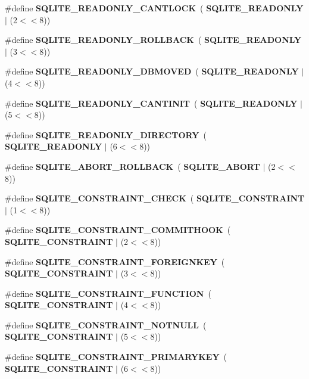 \begin{DoxyCompactItemize}
\item 
\#define \textbf{ S\+Q\+L\+I\+T\+E\+\_\+\+R\+E\+A\+D\+O\+N\+L\+Y\+\_\+\+C\+A\+N\+T\+L\+O\+CK}~(\textbf{ S\+Q\+L\+I\+T\+E\+\_\+\+R\+E\+A\+D\+O\+N\+LY} $\vert$ (2$<$$<$8))
\item 
\#define \textbf{ S\+Q\+L\+I\+T\+E\+\_\+\+R\+E\+A\+D\+O\+N\+L\+Y\+\_\+\+R\+O\+L\+L\+B\+A\+CK}~(\textbf{ S\+Q\+L\+I\+T\+E\+\_\+\+R\+E\+A\+D\+O\+N\+LY} $\vert$ (3$<$$<$8))
\item 
\#define \textbf{ S\+Q\+L\+I\+T\+E\+\_\+\+R\+E\+A\+D\+O\+N\+L\+Y\+\_\+\+D\+B\+M\+O\+V\+ED}~(\textbf{ S\+Q\+L\+I\+T\+E\+\_\+\+R\+E\+A\+D\+O\+N\+LY} $\vert$ (4$<$$<$8))
\item 
\#define \textbf{ S\+Q\+L\+I\+T\+E\+\_\+\+R\+E\+A\+D\+O\+N\+L\+Y\+\_\+\+C\+A\+N\+T\+I\+N\+IT}~(\textbf{ S\+Q\+L\+I\+T\+E\+\_\+\+R\+E\+A\+D\+O\+N\+LY} $\vert$ (5$<$$<$8))
\item 
\#define \textbf{ S\+Q\+L\+I\+T\+E\+\_\+\+R\+E\+A\+D\+O\+N\+L\+Y\+\_\+\+D\+I\+R\+E\+C\+T\+O\+RY}~(\textbf{ S\+Q\+L\+I\+T\+E\+\_\+\+R\+E\+A\+D\+O\+N\+LY} $\vert$ (6$<$$<$8))
\item 
\#define \textbf{ S\+Q\+L\+I\+T\+E\+\_\+\+A\+B\+O\+R\+T\+\_\+\+R\+O\+L\+L\+B\+A\+CK}~(\textbf{ S\+Q\+L\+I\+T\+E\+\_\+\+A\+B\+O\+RT} $\vert$ (2$<$$<$8))
\item 
\#define \textbf{ S\+Q\+L\+I\+T\+E\+\_\+\+C\+O\+N\+S\+T\+R\+A\+I\+N\+T\+\_\+\+C\+H\+E\+CK}~(\textbf{ S\+Q\+L\+I\+T\+E\+\_\+\+C\+O\+N\+S\+T\+R\+A\+I\+NT} $\vert$ (1$<$$<$8))
\item 
\#define \textbf{ S\+Q\+L\+I\+T\+E\+\_\+\+C\+O\+N\+S\+T\+R\+A\+I\+N\+T\+\_\+\+C\+O\+M\+M\+I\+T\+H\+O\+OK}~(\textbf{ S\+Q\+L\+I\+T\+E\+\_\+\+C\+O\+N\+S\+T\+R\+A\+I\+NT} $\vert$ (2$<$$<$8))
\item 
\#define \textbf{ S\+Q\+L\+I\+T\+E\+\_\+\+C\+O\+N\+S\+T\+R\+A\+I\+N\+T\+\_\+\+F\+O\+R\+E\+I\+G\+N\+K\+EY}~(\textbf{ S\+Q\+L\+I\+T\+E\+\_\+\+C\+O\+N\+S\+T\+R\+A\+I\+NT} $\vert$ (3$<$$<$8))
\item 
\#define \textbf{ S\+Q\+L\+I\+T\+E\+\_\+\+C\+O\+N\+S\+T\+R\+A\+I\+N\+T\+\_\+\+F\+U\+N\+C\+T\+I\+ON}~(\textbf{ S\+Q\+L\+I\+T\+E\+\_\+\+C\+O\+N\+S\+T\+R\+A\+I\+NT} $\vert$ (4$<$$<$8))
\item 
\#define \textbf{ S\+Q\+L\+I\+T\+E\+\_\+\+C\+O\+N\+S\+T\+R\+A\+I\+N\+T\+\_\+\+N\+O\+T\+N\+U\+LL}~(\textbf{ S\+Q\+L\+I\+T\+E\+\_\+\+C\+O\+N\+S\+T\+R\+A\+I\+NT} $\vert$ (5$<$$<$8))
\item 
\#define \textbf{ S\+Q\+L\+I\+T\+E\+\_\+\+C\+O\+N\+S\+T\+R\+A\+I\+N\+T\+\_\+\+P\+R\+I\+M\+A\+R\+Y\+K\+EY}~(\textbf{ S\+Q\+L\+I\+T\+E\+\_\+\+C\+O\+N\+S\+T\+R\+A\+I\+NT} $\vert$ (6$<$$<$8))

\end{DoxyCompactItemize}
